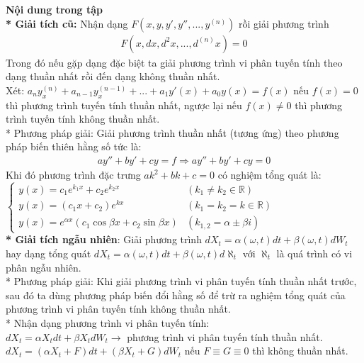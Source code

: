 \documentclass[12pt,a4paper]{article}
\begin{document}
\renewcommand\thesection{\Roman{section}}
\renewcommand\thesubsection{\arabic{subsection}}
\renewcommand\thesubsubsection{\alph{subsubsection}}


\textbf{Nội dung trong tập}\\
\textbf{* Giải tích cũ:} Nhận dạng $F(x,y,y',y'',...,y^{(n)})$ rồi giải phương trình \begin{equation}
	\begin{aligned}
		F(x,dx,d^2x,...,d^{(n)}x)=0
	\end{aligned}
\end{equation}
Trong đó nếu gặp dạng đặc biệt ta giải phương trình vi phân tuyến tính theo dạng thuần nhất rồi đến dạng không thuần nhất.\\
Xét: $a_ny^{(n)}_x+a_{n-1}y^{(n-1)}_x+...+a_1y'(x)+a_0y(x)=f(x)$ nếu $f(x)=0$ thì phương trình tuyến tính thuần nhất, ngược lại nếu $f(x)\neq0$ thì phương trình tuyến tính không thuần nhất.\\
* Phương pháp giải: Giải phương trình thuần nhất (tương ứng) theo phương pháp biến thiên hằng số tức là:
\begin{gather*}
	ay''+by'+cy=f\Rightarrow ay''+by'+cy=0
\end{gather*}
Khi đó phương trình đặc trưng $ak^2+bk+c=0$ có nghiệm tổng quát là:\\
$\begin{cases} y(x)=c_1e^{k_1x}+c_2e^{k_2x} & (k_1\neq k_2 \in \mathbb{R}) \\ y(x)=(c_1x+c_2)e^{kx} & (k_1=k_2=k\in \mathbb{R}) \\ y(x)=e^{\alpha x}(c_1\cos{\beta x}+c_2\sin{\beta x}) & (k_{1,2}=\alpha \pm \beta i) \end{cases}$\\
\textbf{* Giải tích ngẫu nhiên}: Giải phương trình $dX_t=\alpha(\omega,t)dt+\beta(\omega,t)dW_t$ hay dạng tổng quát $dX_t=\alpha(\omega,t)dt+\beta(\omega,t)d\aleph_t$ với $\aleph_t$ là quá trình có vi phân ngẫu nhiên.\\
* Phương pháp giải: Khi giải phương trình vi phân tuyến tính thuần nhất trước, sau đó ta dùng phương pháp biến đổi hằng số để trừ ra nghiệm tổng quát của phương trình vi phân tuyến tính không thuần nhất.\\
* Nhận dạng phương trình vi phân tuyến tính:\\
$dX_t=\alpha X_tdt+\beta X_tdW_t \rightarrow$ phương trình vi phân tuyến tính thuần nhất.\\
$dX_t=(\alpha X_t+F)dt+(\beta X_t+G)dW_t$ nếu $F\equiv G \equiv 0$ thì không thuần nhất.\\
\end{document}
